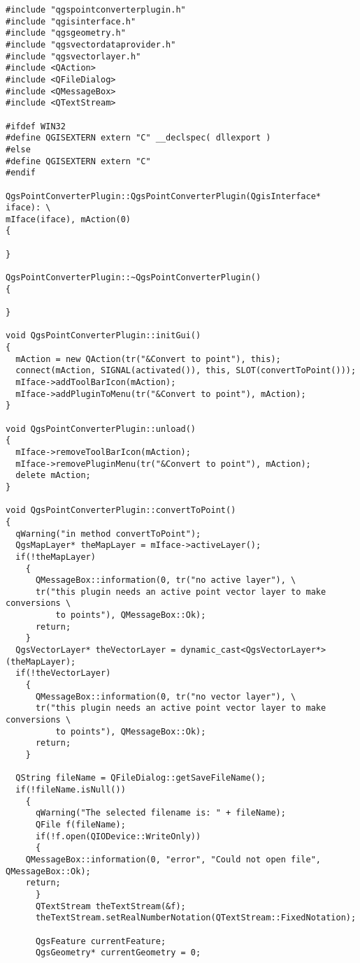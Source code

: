 \begin{verbatim} 
#include "qgspointconverterplugin.h"
#include "qgisinterface.h"
#include "qgsgeometry.h"
#include "qgsvectordataprovider.h"
#include "qgsvectorlayer.h"
#include <QAction>
#include <QFileDialog>
#include <QMessageBox>
#include <QTextStream>

#ifdef WIN32
#define QGISEXTERN extern "C" __declspec( dllexport )
#else
#define QGISEXTERN extern "C"
#endif

QgsPointConverterPlugin::QgsPointConverterPlugin(QgisInterface* iface): \
mIface(iface), mAction(0)
{

}

QgsPointConverterPlugin::~QgsPointConverterPlugin()
{

}

void QgsPointConverterPlugin::initGui()
{
  mAction = new QAction(tr("&Convert to point"), this);
  connect(mAction, SIGNAL(activated()), this, SLOT(convertToPoint()));
  mIface->addToolBarIcon(mAction);
  mIface->addPluginToMenu(tr("&Convert to point"), mAction);
}

void QgsPointConverterPlugin::unload()
{
  mIface->removeToolBarIcon(mAction);
  mIface->removePluginMenu(tr("&Convert to point"), mAction);
  delete mAction;
}

void QgsPointConverterPlugin::convertToPoint()
{
  qWarning("in method convertToPoint");
  QgsMapLayer* theMapLayer = mIface->activeLayer();
  if(!theMapLayer)
    {
      QMessageBox::information(0, tr("no active layer"), \
      tr("this plugin needs an active point vector layer to make conversions \
          to points"), QMessageBox::Ok);
      return;
    }
  QgsVectorLayer* theVectorLayer = dynamic_cast<QgsVectorLayer*>(theMapLayer);
  if(!theVectorLayer)
    {
      QMessageBox::information(0, tr("no vector layer"), \
      tr("this plugin needs an active point vector layer to make conversions \
          to points"), QMessageBox::Ok);
      return;
    }
  
  QString fileName = QFileDialog::getSaveFileName();
  if(!fileName.isNull())
    {
      qWarning("The selected filename is: " + fileName);
      QFile f(fileName);
      if(!f.open(QIODevice::WriteOnly))
      {
	QMessageBox::information(0, "error", "Could not open file", QMessageBox::Ok);
	return;
      }
      QTextStream theTextStream(&f);
      theTextStream.setRealNumberNotation(QTextStream::FixedNotation);

      QgsFeature currentFeature;
      QgsGeometry* currentGeometry = 0;


\end{verbatim}
